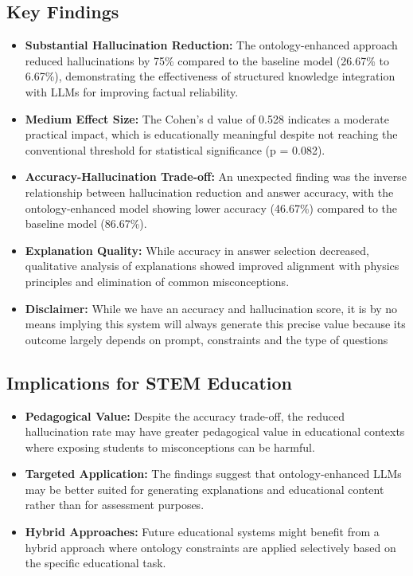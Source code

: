 \subsection{Key Findings}
\begin{itemize}
    \item \textbf{Substantial Hallucination Reduction:} The ontology-enhanced approach reduced hallucinations by 75\% compared to the baseline model (26.67\% to 6.67\%), demonstrating the effectiveness of structured knowledge integration with LLMs for improving factual reliability.
    
    \item \textbf{Medium Effect Size:} The Cohen's d value of 0.528 indicates a moderate practical impact, which is educationally meaningful despite not reaching the conventional threshold for statistical significance (p = 0.082).
    
    \item \textbf{Accuracy-Hallucination Trade-off:} An unexpected finding was the inverse relationship between hallucination reduction and answer accuracy, with the ontology-enhanced model showing lower accuracy (46.67\%) compared to the baseline model (86.67\%).
    
    \item \textbf{Explanation Quality:} While accuracy in answer selection decreased, qualitative analysis of explanations showed improved alignment with physics principles and elimination of common misconceptions.

    \item \textbf{Disclaimer:} While we have an accuracy and hallucination score, it is by no means implying this system will always generate this precise value because its outcome largely depends on prompt, constraints and the type of questions  
\end{itemize}

\subsection{Implications for STEM Education}
\begin{itemize}
    \item \textbf{Pedagogical Value:} Despite the accuracy trade-off, the reduced hallucination rate may have greater pedagogical value in educational contexts where exposing students to misconceptions can be harmful.
    
    \item \textbf{Targeted Application:} The findings suggest that ontology-enhanced LLMs may be better suited for generating explanations and educational content rather than for assessment purposes.
    
    \item \textbf{Hybrid Approaches:} Future educational systems might benefit from a hybrid approach where ontology constraints are applied selectively based on the specific educational task.
\end{itemize}

